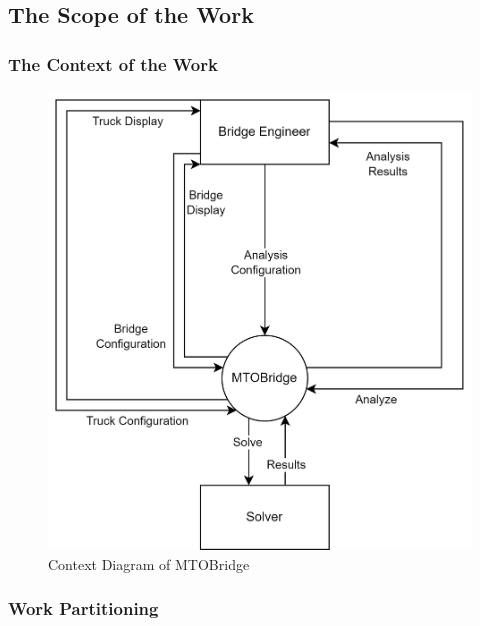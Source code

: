 \documentclass[12pt]{article}
\begin{document}
\subsection{The Scope of the Work}

\subsubsection{The Context of the Work}

\begin{figure}[H]
  \includegraphics[width=\columnwidth]{context-diagram.png}
  \caption{Context Diagram of MTOBridge}
  \label {fig:context-diagram}
\end{figure}

\subsubsection{Work Partitioning}
\end{document}
